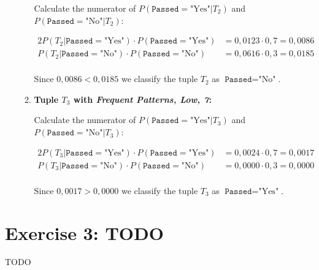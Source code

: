\documentclass[
english,
smallborders
]{i6prcsht}
\newcommand{\BayesNumerator}[3]{P(#1 | \texttt{#2}=\text{"#3"}) \cdot P(\texttt{#2}=\text{"#3"})}
\newcommand{\PosterioriProbability}[3]{P(\texttt{#2}=\text{"#3"} | #1)}
\newcommand{\ResultClass}[2]{\texttt{#1}=\text{"#2"}}
\begin{document}
\begin{solution}
\begin{enumerate}
\begin{enumerate}
			            Calculate the numerator of $\PosterioriProbability{T_2}{Passed}{Yes}$ and $\PosterioriProbability{T_2}{Passed}{No}$:

			            \begin{alignat*}{2}
				            \BayesNumerator{T_2}{Passed}{Yes} & = 0,0123 \cdot 0,7 = 0,0086 \\
				            \BayesNumerator{T_2}{Passed}{No}  & = 0,0616 \cdot 0,3 = 0,0185 \\
			            \end{alignat*}

			            Since $0,0086 < 0,0185$ we classify the tuple $T_2$ as $\ResultClass{Passed}{No}$.

			      \item \textbf{Tuple $T_3$ with \textit{Frequent Patterns, Low, 7}:}

			            Calculate the numerator of $\PosterioriProbability{T_3}{Passed}{Yes}$ and $\PosterioriProbability{T_3}{Passed}{No}$:

			            \begin{alignat*}{2}
				            \BayesNumerator{T_3}{Passed}{Yes} & = 0,0024 \cdot 0,7 = 0,0017 \\
				            \BayesNumerator{T_3}{Passed}{No}  & = 0,0000 \cdot 0,3 = 0,0000 \\
			            \end{alignat*}

			            Since $0,0017 > 0,0000$ we classify the tuple $T_3$ as $\ResultClass{Passed}{Yes}$.
		      \end{enumerate}



	\end{enumerate}
\end{solution}

\section*{Exercise 3: TODO}

TODO
\end{document}
